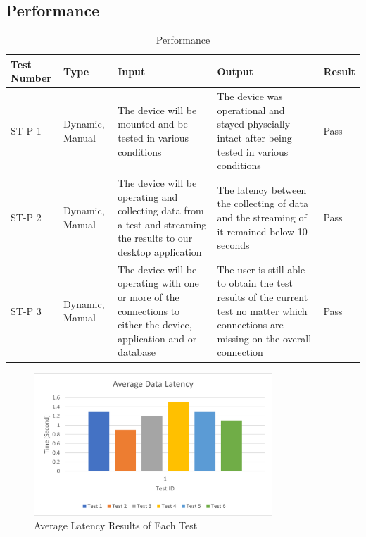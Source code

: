 \documentclass[12pt, titlepage]{article}
\begin{document}
\subsection{Performance}
\begin{table}[H]
  \begin{tabular}{| p{} | p{}| p{}| p{}| p{}|}
    \hline
    \rowcolor[gray]{0.9}
    Test Number & Type & Input & Output & Result\\
    \hline
    ST-P 1 & Dynamic, Manual & The device will be mounted and be tested in various conditions & The device was operational and stayed physcially intact after being tested in various conditions & Pass\\
    \hline
    ST-P 2 & Dynamic, Manual & The device will be operating and collecting data from a test and streaming the results to our desktop application & The latency between the collecting of data and the streaming of it remained below 10 seconds & Pass\\
    \hline
    ST-P 3 & Dynamic, Manual & The device will be operating with one or more of the connections to either the device, application and or database & The user is still able to obtain the test results of the current test no matter which connections are missing on the overall connection & Pass\\
    \hline
  \end{tabular}
  \caption{Performance}
  \end{table}

  \begin{figure}[H]
    \begin{center}
    \includegraphics[width=0.8\textwidth]{Average Latency.png}
    \caption{Average Latency Results of Each Test}
    \end{center}
    \end{figure}
\end{document}
